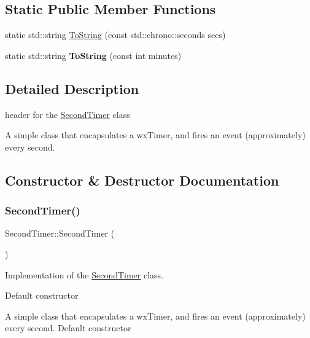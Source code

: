\subsection*{Static Public Member Functions}
\begin{DoxyCompactItemize}
\item 
static std\+::string \hyperlink{class_second_timer_a9a4c3b666de65077a44c4f8048d72107}{To\+String} (const std\+::chrono\+::seconds secs)
\item 
\mbox{\label{class_second_timer_a9ec91d25f55835a007fc5bfb1abef65f}} 
static std\+::string {\bfseries To\+String} (const int minutes)
\end{DoxyCompactItemize}


\subsection{Detailed Description}
header for the \hyperlink{class_second_timer}{Second\+Timer} class 

A simple class that encapsulates a wx\+Timer, and fires an event (approximately) every second. 

\subsection{Constructor \& Destructor Documentation}
\mbox{\label{class_second_timer_ac9fadd2cf50106982c642b8142d99252}} 
\subsubsection{\texorpdfstring{Second\+Timer()}{SecondTimer()}}
{\footnotesize\ttfamily Second\+Timer\+::\+Second\+Timer (\begin{DoxyParamCaption}{ }\end{DoxyParamCaption})}



Implementation of the \hyperlink{class_second_timer}{Second\+Timer} class. 

Default constructor

A simple class that encapsulates a wx\+Timer, and fires an event (approximately) every second. Default constructor \mbox{\label{class_second_timer_a1502fddbf09df489c7fa2e0a0e38e7cd}} 
